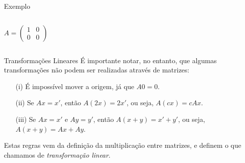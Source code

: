 \documentclass{beamer}
\begin{document}
\begin{darkframes}
\begin{frame}{Exemplo}
  \begin{center}
    \begin{columns}
      \begin{equation*}
        A =
        \begin{pmatrix}
          1 & 0\\
          0 &0
        \end{pmatrix}
      \end{equation*}
    \end{columns}
  \end{center}
\end{frame}

\begin{frame}{Transformações Lineares}
  É importante notar, no entanto, que algumas transformações não podem ser realizadas através de matrizes:
  
  \begin{itemize}
  \item[(i)] É impossível mover a origem, já que $A0=0$.
  \item[(ii)] Se $Ax=x'$, então $A(2x) = 2x'$, ou seja, $A(cx)=cAx$.
  \item[(iii)] Se $Ax=x'$ e $Ay=y'$, então $A(x+y)=x'+y'$, ou seja, $A(x+y)=Ax+Ay$.
  \end{itemize}
  
  Estas regras vem da definição da multiplicação entre matrizes, e definem o que chamamos de \emph{transformação linear}.
\end{frame}


\end{darkframes}
\end{document}
